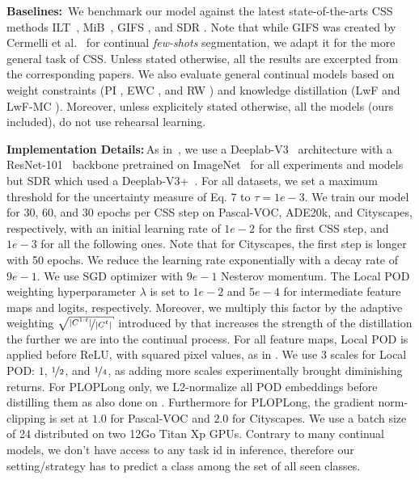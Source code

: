\noindent\textbf{Baselines:\,} We benchmark our model against the latest state-of-the-arts CSS
methods ILT~\citep{michieli2019ilt}, MiB~\citep{cermelli2020modelingthebackground}, GIFS
\citep{cermelli2020fewshotcontinualsegm}, and SDR \citep{michieli2021sdr}. Note that while GIFS was
created by Cermelli et al.~\citep{cermelli2020fewshotcontinualsegm} for continual \textit{few-shots}
segmentation, we adapt it for the more general task of CSS. Unless stated otherwise, all the results
are excerpted from the corresponding papers. We also evaluate general continual models based on
weight constraints (PI \citep{zenke2017synaptic_intelligence}, EWC \citep{kirkpatrick2017ewc}, and RW
\citep{chaudhry2018riemannien_walk}) and knowledge distillation (LwF \citep{li2018lwf} and LwF-MC
\citep{rebuffi2017icarl}). Moreover, unless explicitely stated otherwise, all the models (ours
included), do not use rehearsal learning.

\noindent\textbf{Implementation Details:\,}As in~\citep{cermelli2020modelingthebackground}, we use a
Deeplab-V3~\citep{chen2017deeplabv3} architecture with a ResNet-101~\citep{he2016resnet} backbone
pretrained on ImageNet~\citep{deng2009imagenet} for all experiments and models but SDR
\citep{michieli2021sdr} which used a Deeplab-V3+~\citep{chen2018deeplabv3plus}. For all datasets, we
set a maximum threshold for the uncertainty measure of Eq. 7 to $\tau=1e-3$. We train our model for
30, 60, and 30 epochs per CSS step on Pascal-VOC, ADE20k, and Cityscapes, respectively, with an
initial learning rate of $1e-2$ for the first CSS step, and $1e-3$ for all the following ones. Note
that for Cityscapes, the first step is longer with 50 epochs. We reduce the learning rate
exponentially with a decay rate of $9e-1$. We use SGD optimizer with $9e-1$ Nesterov momentum. The
Local POD weighting hyperparameter $\lambda$ is set to $1e-2$ and $5e-4$ for intermediate feature
maps and logits, respectively. Moreover, we multiply this factor by the adaptive weighting
$\sqrt{\nicefrac{|C^{1:t}|}{|C^{t}|}}$ introduced by \citep{hou2019ucir} that increases the strength
of the distillation the further we are into the continual process. For all feature maps, Local POD
is applied before ReLU, with squared pixel values, as in
\citep{zagoruyko2016distillation_attention,douillard2020podnet}. We use 3 scales for Local POD: $1$,
$\nicefrac{1}{2}$, and $\nicefrac{1}{4}$, as adding more scales experimentally brought diminishing
returns. For PLOPLong only, we L2-normalize all POD embeddings before distilling them as also done
on \citep{douillard2020podnet}. Furthermore for PLOPLong, the gradient norm-clipping is set at $1.0$
for Pascal-VOC and $2.0$ for Cityscapes. We use a batch size of 24 distributed on two 12Go Titan Xp
GPUs. Contrary to many continual models, we don't have access to any task id in inference, therefore
our setting/strategy has to predict a class among the set of all seen classes.


